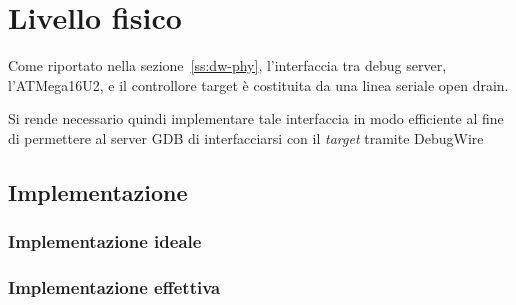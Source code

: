 \chapter{Livello fisico}

Come riportato nella sezione~\ref{ss:dw-phy}, l'interfaccia tra debug server, l'ATMega16U2, e il controllore target è costituita da una linea seriale open drain.

Si rende necessario quindi implementare tale interfaccia in modo efficiente al fine di permettere al server GDB di interfacciarsi con il \textit{target} tramite DebugWire

\section{Implementazione}
\subsection{Implementazione ideale}
\subsection{Implementazione effettiva}
